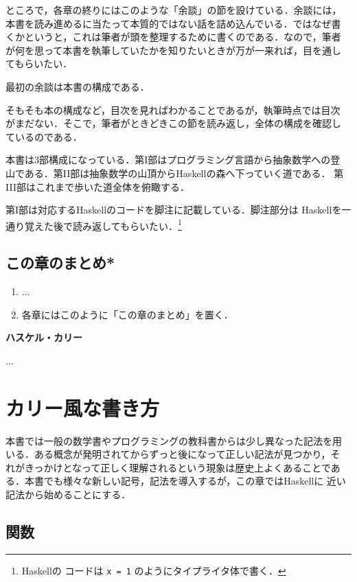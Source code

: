 \documentclass[a5paper,twoside,fleqn,draft]{jsbook}
\newcommand{\programminglanguage}[1]{\textsf{#1}}
\newcommand{\haskell}{\programminglanguage{Haskell}}
\newenvironment{leader}{\begingroup\gt}{\endgroup}
\newenvironment{note}[1]{\begin{boxnote}\begin{center}\textbf{#1}\end{center}}{\end{boxnote}}
\newcommand{\code}[1]{\texttt{#1}}
\begin{document}
ところで，各章の終りにはこのような「余談」の節を設けている．余談には，
本書を読み進めるに当たって本質的ではない話を詰め込んでいる．ではなぜ書
くかというと，これは筆者が頭を整理するために書くのである．なので，筆者
が何を思って本書を執筆していたかを知りたいときが万が一来れば，目を通し
てもらいたい．

最初の余談は本書の構成である．

そもそも本の構成など，目次を見ればわかることであるが，執筆時点では目次
がまだない．そこで，筆者がときどきこの節を読み返し，全体の構成を確認し
ているのである．

本書は3部構成になっている．第I部はプログラミング言語から抽象数学への登
山である．第II部は抽象数学の山頂から\haskell の森へ下っていく道である．
第III部はこれまで歩いた道全体を俯瞰する．

第I部は対応する\haskell のコードを脚注に記載している．脚注部分は
\haskell を一通り覚えた後で読み返してもらいたい．\footnote{\haskell の
  コードは \code{x = 1} のようにタイプライタ体で書く．}

\section{この章のまとめ*}

\begin{enumerate}
\item ...  \item 各章にはこのように「この章のまとめ」を置く．
\end{enumerate}


\begin{note}{ハスケル・カリー}
...
\end{note}


\chapter{カリー風な書き方}
\label{ch:curry}

\begin{leader}
本書では一般の数学書やプログラミングの教科書からは少し異なった記法を用
いる．ある概念が発明されてからずっと後になって正しい記法が見つかり，そ
れがきっかけとなって正しく理解されるという現象は歴史上よくあることであ
る．本書でも様々な新しい記号，記法を導入するが，この章では\haskell に
近い記法から始めることにする．
\end{leader}

\section{関数}
\end{document}
